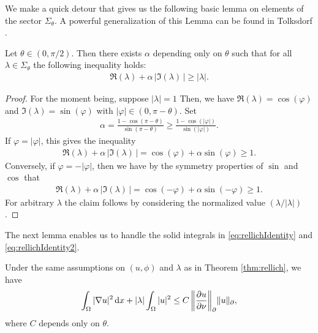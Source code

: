 We make a quick detour that gives us the following basic lemma on elements of the sector $\Sigma_\theta$.
A powerful generalization of this Lemma can be found in Tolksdorf \cite[Lem. 5.2.4]{tolksdorf}.

\begin{lem}
  \label{lem:lambdaIneq}
  Let $\theta \in (0,\pi/2)$.
  Then there exists $\alpha$ depending only on $\theta$ such that for all $\lambda \in \Sigma_\theta$ the following inequality holds:
  \begin{align*}
    \Re(\lambda) + \alpha \, \big|\Im(\lambda)\,\big| \geq |\lambda|.
  \end{align*}
\end{lem}

\begin{proof}
  For the moment being, suppose $|\lambda| = 1$ Then, we have $\Re(\lambda) = \cos(\varphi)$ and $\Im(\lambda) = \sin(\varphi)$ with $|\varphi| \in (0, \pi - \theta)$. 
  Set
  \begin{align*}
    \alpha = \frac{1 - \cos(\pi - \theta)}{\sin(\pi - \theta)} \geq \frac{1 - \cos(|\varphi|)}{\sin(|\varphi|)}.
  \end{align*}
  If $\varphi = |\varphi|$, this gives the inequality
  \begin{align*}
    \Re(\lambda) + \alpha \, |\Im(\lambda)\,| = \cos(\varphi) + \alpha \sin(\varphi) \geq 1.
  \end{align*}
  Conversely, if $\varphi = -|\varphi|$, then we have by the symmetry properties of $\sin$ and $\cos$ that
  \begin{align*}
    \Re(\lambda) + \alpha\, |\Im(\lambda)\,| = \cos(-\varphi) + \alpha \sin(-\varphi) \geq 1.
  \end{align*}
  For arbitrary $\lambda$ the claim follows by considering the normalized value $(\lambda / |\lambda|)$.
\end{proof}

The next lemma enables us to handle the solid integrals in \eqref{eq:rellichIdentity} and \eqref{eq:rellichIdentity2}.

\begin{lem}
  \label{lem:laxMilgramIneq}
  Under the same assumptions on $(u,\phi)$ and $\lambda$ as in Theorem \ref{thm:rellich}, we have
  \begin{align}
    \label{eq:laxMilgramIneq}
    \int_\Omega |\nabla u|^2 \, {\operatorname{d}\!{x}} + |\lambda| \int_\Omega |u|^2 \leq C \,\bigg\| \frac{\partial u}{\partial \nu} \bigg\|_\partial  \|u\|_\partial,
  \end{align}
  where $C$ depends only on $\theta$.
\end{lem}

